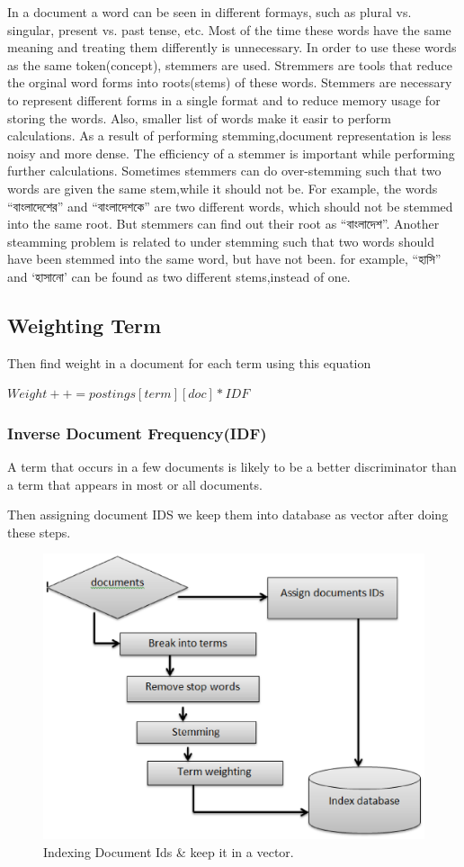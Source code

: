 In a document a word can be seen in different formays, such as plural vs. singular, present vs. past tense, etc. Most of the time these words have the same meaning and treating them differently is unnecessary. In order to use these words as the same token(concept), stemmers are used.
Stremmers are tools that reduce the orginal word forms into roots(stems) of these words. Stemmers are necessary to represent different forms in a single format and to reduce memory usage for storing the words. Also, smaller list of words make it easir to perform calculations. As a result of performing stemming,document representation is less noisy and more dense. The efficiency of a stemmer is important while performing further calculations.
Sometimes stemmers can do over-stemming such that two words are given the same stem,while it should not be. For example, the words “বাংলাদেশের” and “বাংলাদেশকে” are two different words, which should not be stemmed into the same root. But stemmers can find out their root as “বাংলাদেশ”. Another steamming problem is related to under stemming such that two words should have been stemmed into the same word, but have not been. for example, “হাসি” and ‘হাসানো’ can be found as two different stems,instead of one.


\subsection{Weighting Term}

Then find weight in a document for each term using this equation

\(Weight++=postings[term][doc]*IDF\)

\subsubsection{Inverse Document Frequency(IDF)}

A term that occurs in a few documents is likely to be a better discriminator than a term that appears in most or all documents.

Then assigning document IDS we keep them into database as vector after doing these steps.


\begin{figure}[htp]
	\centering
		\includegraphics[width=.65\textwidth]{figure/two.eps}
	\caption{Indexing Document Ids \& keep it in a vector.}
	\label{Figure:indexing}
\end{figure}



